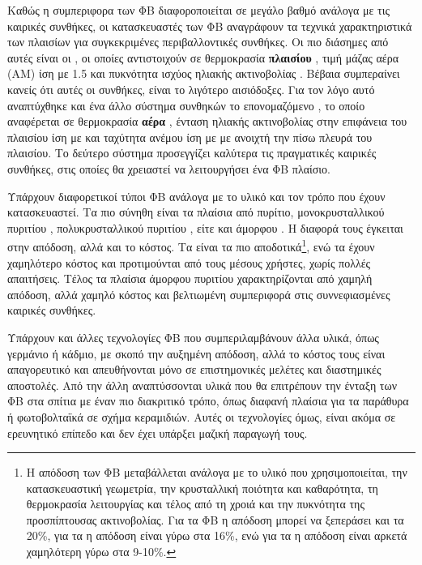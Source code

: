 \documentclass[12pt]{report}
\begin{document}
Καθώς η συμπεριφορα των ΦΒ διαφοροποιείται σε μεγάλο βαθμό ανάλογα με τις καιρικές συνθήκες, οι κατασκευαστές των ΦΒ αναγράφουν τα τεχνικά χαρακτηριστικά των πλαισίων για συγκεκριμένες περιβαλλοντικές συνθήκες. Οι πιο διάσημες
από αυτές είναι οι {}, οι οποίες αντιστοιχούν σε θερμοκρασία \textbf{πλαισίου} {}, τιμή μάζας αέρα (ΑΜ) ίση με 1.5 και πυκνότητα ισχύος ηλιακής ακτινοβολίας 
{}. Βέβαια συμπεραίνει κανείς ότι αυτές οι συνθήκες, είναι το λιγότερο αισιόδοξες. Για τον λόγο αυτό αναπτύχθηκε και ένα άλλο σύστημα συνθηκών το επονομαζόμενο 
{}, το οποίο αναφέρεται σε θερμοκρασία \textbf{αέρα} {}, ένταση ηλιακής ακτινοβολίας στην επιφάνεια του πλαισίου ίση με {} 
και ταχύτητα ανέμου ίση με {} με ανοιχτή την πίσω πλευρά του πλαισίου. Το δεύτερο σύστημα προσεγγίζει καλύτερα τις πραγματικές καιρικές συνθήκες, στις οποίες θα χρειαστεί να λειτουργήσει ένα ΦΒ πλαίσιο. 

Υπάρχουν διαφορετικοί τύποι ΦΒ ανάλογα με το υλικό και τον τρόπο που έχουν κατασκευαστεί. Τα πιο σύνηθη είναι τα πλαίσια από πυρίτιο, μονοκρυσταλλικού πυριτίου {}, πολυκρυσταλλικού πυριτίου 
{}, είτε και άμορφου {}. Η διαφορά τους έγκειται στην απόδοση, αλλά και το κόστος. Τα {} είναι τα πιο αποδοτικά\footnote{Η απόδοση των ΦΒ μεταβάλλεται ανάλογα με το 
υλικό που χρησιμοποιείται, την κατασκευαστική γεωμετρία, την κρυσταλλική ποιότητα και καθαρότητα, τη θερμοκρασία λειτουργίας και τέλος από τη χροιά και την πυκνότητα της προσπίπτουσας ακτινοβολίας. Για τα {}
ΦΒ η απόδοση μπορεί να ξεπεράσει και τα 20\%, για τα {} η απόδοση είναι γύρω στα 16\%, ενώ για τα {} η απόδοση είναι αρκετά χαμηλότερη γύρω στα 9-10\%.}, 
ενώ τα {} έχουν χαμηλότερο κόστος και προτιμούνται από τους μέσους χρήστες, χωρίς πολλές απαιτήσεις. Τέλος τα πλαίσια άμορφου πυριτίου χαρακτηρίζονται από χαμηλή απόδοση, αλλά χαμηλό κόστος και βελτιωμένη 
συμπεριφορά στις συννεφιασμένες καιρικές συνθήκες.

Υπάρχουν και άλλες τεχνολογίες ΦΒ που συμπεριλαμβάνουν άλλα υλικά, όπως γερμάνιο ή κάδμιο, με σκοπό την αυξημένη απόδοση, αλλά το κόστος τους είναι απαγορευτικό και απευθήνονται μόνο σε επιστημονικές μελέτες και διαστημικές
αποστολές. Από την άλλη αναπτύσσονται υλικά που θα επιτρέπουν την ένταξη των ΦΒ στα σπίτια με έναν πιο διακριτικό τρόπο, όπως διαφανή πλαίσια για τα παράθυρα ή φωτοβολταϊκά σε σχήμα κεραμιδιών. Αυτές οι τεχνολογίες όμως, είναι
ακόμα σε ερευνητικό επίπεδο και δεν έχει υπάρξει μαζική παραγωγή τους.
\end{document}
